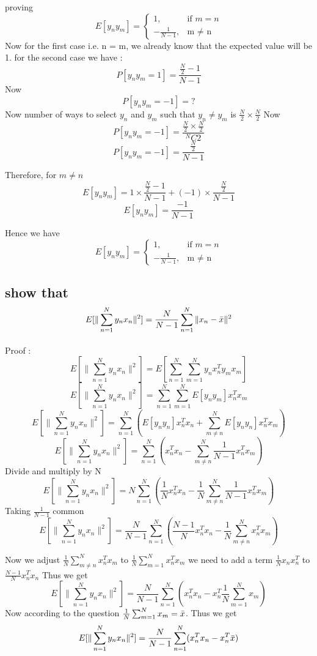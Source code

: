 \documentclass{article}
\begin{document}
proving 
\[
   E[y_ny_m]= 
\begin{cases}
    1,& \text{if } m = n \\
    -\frac{1}{N-1},              & \text{m $\neq$ n}
\end{cases}
\] 
Now for the first case i.e. n = m, we already know that the expected value will be 1.
for the second case we have :
$$P[y_ny_m = 1 ] = \frac{\frac{N}{2} - 1 }{N-1} $$
Now 
$$P[y_ny_m = -1 ] =?$$
Now number of ways to select $y_n$ and $y_m $ such that $y_n\neq y_m$ is 
$\frac{N}{2}\times\frac{N}{2}$
Now 
$$P[y_ny_m = -1 ] = \frac{\frac{N}{2}\times\frac{N}{2}}{^NC2}$$
$$P[y_ny_m = -1 ] = \frac{\frac{N}{2}}{N-1}$$

Therefore, for $m \neq n $
$$E[y_ny_m] = 1\times  \frac{\frac{N}{2} - 1 }{N-1} + (-1) \times \frac{\frac{N}{2}}{N-1} $$
$$E[y_ny_m] = \frac{-1}{N-1}$$

Hence we have 
\[
   E[y_ny_m]= 
\begin{cases}
    1,& \text{if } m = n \\
    -\frac{1}{N-1},              & \text{m $\neq$ n}
\end{cases}
\] 
\subsection{show that $$E[\|\sum_{n=1}^{N}y_nx_n\|^2] = \frac{N}{N-1}\sum_{n=1}^{N}\|x_n - \Bar{x}\|^2$$}
Proof :
$$
E[\|\sum_{n=1}^{N}y_nx_n\|^2] = E[\sum_{n=1}^{N}\sum_{m=1}^{N}y_nx_n^Ty_mx_m ]
$$
$$
E[\|\sum_{n=1}^{N}y_nx_n\|^2] = \sum_{n=1}^{N}\sum_{m=1}^{N}E[y_ny_m]x_n^Tx_m 
$$
$$
E[\|\sum_{n=1}^{N}y_nx_n\|^2] = \sum_{n=1}^{N}(E[y_ny_n]x_n^Tx_n + \sum_{m \neq n}^{N} E[y_ny_n]x_n^Tx_m)
$$
$$
E[\|\sum_{n=1}^{N}y_nx_n\|^2] = \sum_{n=1}^{N}(x_n^Tx_n - \sum_{m \neq n}^{N} \frac{1}{N-1}x_n^Tx_m)
$$
Divide and multiply by N
$$
E[\|\sum_{n=1}^{N}y_nx_n\|^2] = N\sum_{n=1}^{N}(\frac{1}{N}x_n^Tx_n -\frac{1}{N}\sum_{m \neq n}^{N} \frac{1}{N-1}x_n^Tx_m)
$$
Taking $\frac{1}{N-1}$ common 
$$
E[\|\sum_{n=1}^{N}y_nx_n\|^2] = \frac{N}{N-1}\sum_{n=1}^{N}(\frac{N-1}{N}x_n^Tx_n - \frac{1}{N}\sum_{m \neq n}^{N}x_n^Tx_m)
$$

Now we adjust $\frac{1}{N}\sum_{m \neq n}^{N}x_n^Tx_m $ to $\frac{1}{N}\sum_{m = 1}^{N}x_n^Tx_m $ we need to add a term $\frac{1}{N}x_nx_n^T$ to $\frac{N-1}{N}x_n^Tx_n$
Thus we get 
$$
E[\|\sum_{n=1}^{N}y_nx_n\|^2] = \frac{N}{N-1}\sum_{n=1}^{N}(x_n^Tx_n - x_n^T\frac{1}{N}\sum_{m =1}^{N}x_m)
$$
Now according to the question $\frac{1}{N}\sum_{m =1}^{N}x_m = \Bar{x}$. Thus we get 
$$
E[\|\sum_{n=1}^{N}y_nx_n\|^2] = \frac{N}{N-1}\sum_{n=1}^{N}(x_n^Tx_n - x_n^T\Bar{x})
$$
\end{document}
